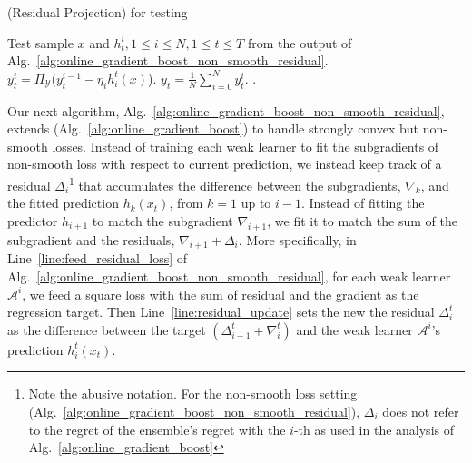 \begin{algorithm}[tb]
\caption{\algshort (Residual Projection) for testing}
 \label{alg:online_gradient_boost_non_smooth_residual_test}
\begin{algorithmic}[1]
   Test sample $x$ and $h_t^i, 1\leq i\leq N, 1\leq t\leq T$ from the output of Alg.~\ref{alg:online_gradient_boost_non_smooth_residual}.
     \label{line:for_loop}
        \STATE $y_t^{i} = \Pi_{\mathcal{Y}}(y_t^{i-1} - \eta_i h_i^t(x)$).
    \ENDFOR
    \STATE $y_t = \frac{1}{N}\sum_{i=0}^N y_t^i$. 
  \ENDFOR
  .  \label{line:stoch_return_non_smooth}
\end{algorithmic}
\end{algorithm}





Our next algorithm, Alg.~\ref{alg:online_gradient_boost_non_smooth_residual}, extends \algshort (Alg.~\ref{alg:online_gradient_boost}) to handle strongly convex but non-smooth losses. Instead of training each weak learner to fit the subgradients of non-smooth loss with respect to current prediction, we instead keep track of a residual $\Delta_i$\footnote{Note the abusive notation. For the non-smooth loss setting (Alg.~\ref{alg:online_gradient_boost_non_smooth_residual}), $\Delta_i$ does not refer to the regret of the ensemble's regret with the $i$-th as used in the analysis of Alg.~\ref{alg:online_gradient_boost}} that accumulates the difference between the subgradients, $\nabla_k$, and the fitted prediction $h_k(x_t)$, from $k=1$ up to $i-1$. Instead of fitting the predictor $h_{i+1}$ to match the subgradient $\nabla_{i+1}$, we fit it to match the sum of the subgradient and the residuals, $\nabla_{i+1} + \Delta_{i}$. More specifically, in Line~\ref{line:feed_residual_loss} of Alg.~\ref{alg:online_gradient_boost_non_smooth_residual}, for each weak learner $\mathcal{A}^i$, we feed a square loss with the sum of residual and the gradient as the regression target. Then Line~\ref{line:residual_update} sets the new the residual $\Delta_i^t$ as the difference between the target $(\Delta_{i-1}^t + \nabla_i^t)$ and the weak learner $\mathcal{A}^i$'s prediction $h_i^t(x_t)$.

